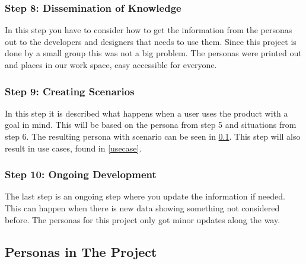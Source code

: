 \subsubsection{Step 8: Dissemination of Knowledge}
In this step you have to consider how to get the information from the personas out to the developers and designers that needs to use them. Since this project is done by a small group this was not a big problem. The personas were printed out and places in our work space, easy accessible for everyone.

\subsubsection{Step 9: Creating Scenarios}
In this step it is described what happens when a user uses the product with a goal in mind. This will be based on the persona from step 5 and situations from step 6. The resulting persona with scenario can be seen in \cref{akkpersona}. This step will also result in use cases, found in \cref{usecase}.

\subsubsection{Step 10: Ongoing Development}
The last step is an ongoing step where you update the information if needed. This can happen when there is new data showing something not considered before. The personas for this project only got minor updates along the way.

\subsection{Personas in The Project}
\label{akkpersona}



